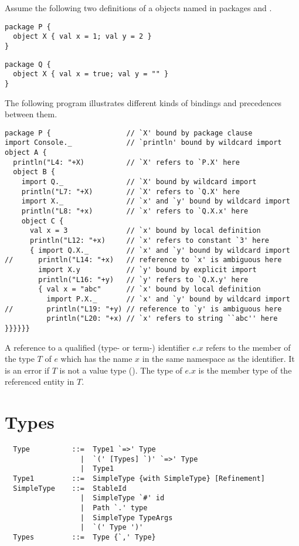 \example Assume the following two definitions of a objects named \lstinline@X@ in packages \lstinline@P@ and \lstinline@Q@.
\begin{lstlisting}
package P {
  object X { val x = 1; val y = 2 }
}
\end{lstlisting}
\begin{lstlisting}
package Q {
  object X { val x = true; val y = "" }
}
\end{lstlisting}
The following program illustrates different kinds of bindings and
precedences between them.
\begin{lstlisting}
package P {                  // `X' bound by package clause
import Console._             // `println' bound by wildcard import
object A {                   
  println("L4: "+X)          // `X' refers to `P.X' here
  object B {
    import Q._               // `X' bound by wildcard import
    println("L7: "+X)        // `X' refers to `Q.X' here
    import X._               // `x' and `y' bound by wildcard import
    println("L8: "+x)        // `x' refers to `Q.X.x' here
    object C {
      val x = 3              // `x' bound by local definition
      println("L12: "+x)     // `x' refers to constant `3' here
      { import Q.X._         // `x' and `y' bound by wildcard import
//      println("L14: "+x)   // reference to `x' is ambiguous here
        import X.y           // `y' bound by explicit import
        println("L16: "+y)   // `y' refers to `Q.X.y' here
        { val x = "abc"      // `x' bound by local definition
          import P.X._       // `x' and `y' bound by wildcard import
//        println("L19: "+y) // reference to `y' is ambiguous here
          println("L20: "+x) // `x' refers to string ``abc'' here
}}}}}}
\end{lstlisting}

A reference to a qualified (type- or term-) identifier $e.x$ refers to
the member of the type $T$ of $e$ which has the name $x$ in the same
namespace as the identifier. It is an error if $T$ is not a value type
(). The type of $e.x$ is the member type of the
referenced entity in $T$.

\chapter{\label{sec:types}Types}

\syntax\begin{lstlisting}
  Type          ::=  Type1 `=>' Type
                  |  `(' [Types] `)' `=>' Type
                  |  Type1
  Type1         ::=  SimpleType {with SimpleType} [Refinement]
  SimpleType    ::=  StableId
                  |  SimpleType `#' id
                  |  Path `.' type
                  |  SimpleType TypeArgs
                  |  `(' Type ')'
  Types         ::=  Type {`,' Type}
\end{lstlisting}


